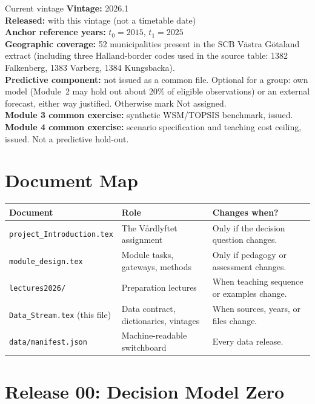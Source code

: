 \documentclass[11pt,a4paper]{article}
\begin{document}
\begin{databox}{Current vintage}
\textbf{Vintage:} 2026.1\\
\textbf{Released:} with this vintage (not a timetable date)\\
\textbf{Anchor reference years:} $t_0 = 2015$, $t_1 = 2025$\\
\textbf{Geographic coverage:} 52 municipalities present in the SCB
V\"astra G\"otaland extract (including three Halland-border codes used
in the source table: 1382 Falkenberg, 1383 Varberg, 1384 Kungsbacka).\\
\textbf{Predictive component:} not issued as a common file.
Optional for a group: own model (Module~2 may hold out
about 20\% of eligible observations) or an external forecast,
either way justified. Otherwise mark Not assigned.\\
\textbf{Module 3 common exercise:} synthetic WSM/TOPSIS benchmark,
issued.\\
\textbf{Module 4 common exercise:} scenario specification and teaching
cost ceiling, issued. Not a predictive hold-out.
\end{databox}

\section{Document Map}

\begin{center}
\small
\begin{tabularx}{\textwidth}{@{}p{}p{}X@{}}
\toprule
Document & Role & Changes when? \\
\midrule
\texttt{project\_Introduction.tex} &
The V{\aa}rdlyftet assignment &
Only if the decision question changes. \\[0.6em]
\texttt{module\_design.tex} &
Module tasks, gateways, methods &
Only if pedagogy or assessment changes. \\[0.6em]
\texttt{lectures2026/} &
Preparation lectures &
When teaching sequence or examples change. \\[0.6em]
\texttt{Data\_Stream.tex} (this file)
& Data contract, dictionaries, vintages &
When sources, years, or files change. \\[0.6em]
\texttt{data/manifest.json} &
Machine-readable switchboard &
Every data release. \\
\bottomrule
\end{tabularx}
\end{center}

\section{Release 00: Decision Model Zero}
\end{document}

